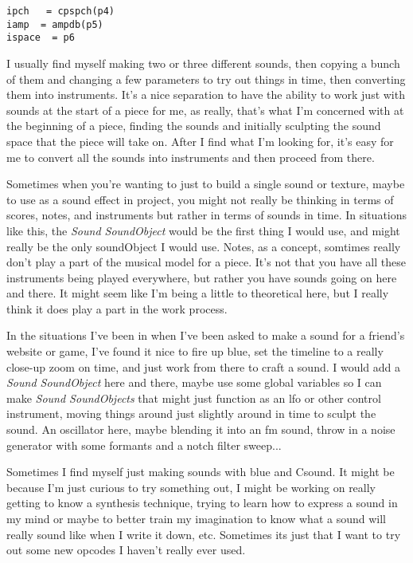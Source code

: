 \begin{verbatim}
ipch   = cpspch(p4)
iamp  = ampdb(p5)
ispace  = p6
\end{verbatim}

I usually find myself making two or three different sounds, then copying
a bunch of them and changing a few parameters to try out things in time,
then converting them into instruments. It's a nice separation to have
the ability to work just with sounds at the start of a piece for me, as
really, that's what I'm concerned with at the beginning of a piece,
finding the sounds and initially sculpting the sound space that the
piece will take on. After I find what I'm looking for, it's easy for me
to convert all the sounds into instruments and then proceed from there.

Sometimes when you're wanting to just to build a single sound or
texture, maybe to use as a sound effect in project, you might not really
be thinking in terms of scores, notes, and instruments but rather in
terms of sounds in time. In situations like this, the \emph{Sound
SoundObject} would be the first thing I would use, and might really be
the only soundObject I would use. Notes, as a concept, somtimes really
don't play a part of the musical model for a piece. It's not that you
have all these instruments being played everywhere, but rather you have
sounds going on here and there. It might seem like I'm being a little to
theoretical here, but I really think it does play a part in the work
process.

In the situations I've been in when I've been asked to make a sound for
a friend's website or game, I've found it nice to fire up blue, set the
timeline to a really close-up zoom on time, and just work from there to
craft a sound. I would add a \emph{Sound SoundObject} here and there,
maybe use some global variables so I can make \emph{Sound SoundObjects}
that might just function as an lfo or other control instrument, moving
things around just slightly around in time to sculpt the sound. An
oscillator here, maybe blending it into an fm sound, throw in a noise
generator with some formants and a notch filter sweep...

Sometimes I find myself just making sounds with blue and Csound. It
might be because I'm just curious to try something out, I might be
working on really getting to know a synthesis technique, trying to learn
how to express a sound in my mind or maybe to better train my
imagination to know what a sound will really sound like when I write it
down, etc. Sometimes its just that I want to try out some new opcodes I
haven't really ever used.

